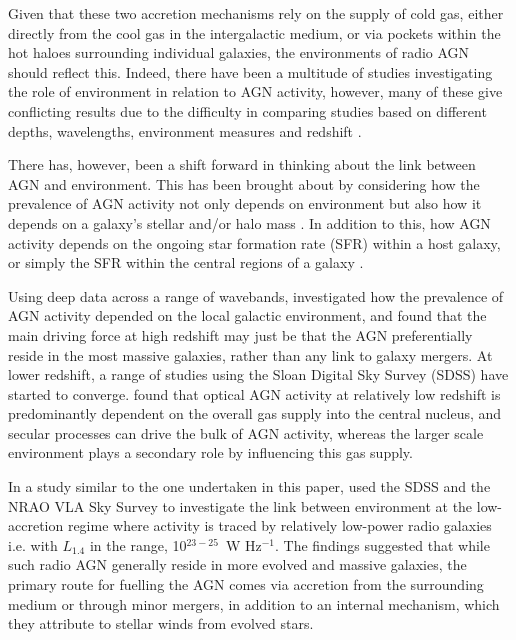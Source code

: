 Given that these two accretion mechanisms rely on the supply of cold gas, either directly from the cool gas in the intergalactic medium, or via pockets within the hot haloes surrounding individual galaxies, the environments of radio AGN should reflect this. Indeed, there have been a multitude of studies investigating the role of environment in relation to AGN activity, however, many of these give conflicting results due to the difficulty in comparing studies based on different depths, wavelengths, environment measures and redshift \citep[e.g.][]{best2004,cooper2005,sorrentino2006,tasse2011,sabater2013,
karouzos2014a,malavasi2015}.

There has, however, been a shift forward in thinking about the link between AGN and environment. This has been brought about by considering how the prevalence of AGN activity not only depends on environment but also how it depends on a galaxy's stellar and/or halo mass \citep[e.g.][]{WilliamsRottgering2015}. In addition to this, how AGN activity depends on the ongoing star formation rate (SFR) within a host galaxy, or simply the SFR within the central regions of a galaxy \citep[e.g.][]{sabater2015}. 

Using deep data across a range of wavebands, \cite{karouzos2014a} investigated how the prevalence of AGN activity depended on the local galactic environment, and found that the main driving force at high redshift may just be that the AGN preferentially reside in the most massive galaxies, rather than any link to galaxy mergers. At lower redshift, a range of studies using the Sloan Digital Sky Survey (SDSS) have started to converge. \citet{sabater2015} found that optical AGN activity at relatively low redshift is predominantly dependent on the overall gas supply into the central nucleus, and secular processes can drive the bulk of AGN activity, whereas the larger scale environment plays a secondary role by influencing this gas supply.

In a study similar to the one undertaken in this paper, \citet{ellison2015} used the SDSS and the NRAO VLA Sky Survey \citep[NVSS;][]{condon1998} to investigate the link between environment at the low-accretion regime where activity is traced by relatively low-power radio galaxies i.e. with $L_{1.4}$ in the range, 10$^{23-25}$~W Hz$^{-1}.$ The findings suggested that while such radio AGN generally reside in more evolved and massive galaxies, the primary route for fuelling the AGN comes via accretion from the surrounding medium or through minor mergers, in addition to an internal mechanism, which they attribute to stellar winds from evolved stars.

